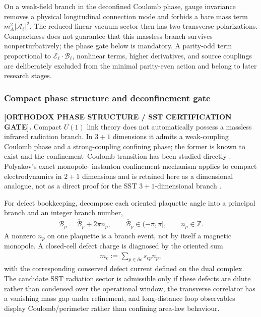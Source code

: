On a weak-field branch in the deconfined Coulomb phase, gauge invariance removes
a physical longitudinal connection mode and forbids a bare mass term
$m_A^2|\boldsymbol{\mathcal A}_\ell|^2$.  The reduced linear vacuum sector then
has two transverse polarizations.  Compactness does not guarantee that this
massless branch survives nonperturbatively; the phase gate below is mandatory.
A parity-odd term proportional
to $\boldsymbol{\mathcal E}_\ell\cdot\boldsymbol{\mathcal B}_\ell$, nonlinear
terms, higher derivatives, and source couplings are deliberately excluded from
the minimal parity-even action and belong to later research stages.

\subsubsection{Compact phase structure and deconfinement gate}
\label{subsubsec:rt_compact_u1_deconfinement_gate}

\textbf{[ORTHODOX PHASE STRUCTURE / SST CERTIFICATION GATE].}
Compact \(U(1)\) link theory does not automatically possess a massless infrared
radiation branch.  In \(3{+}1\) dimensions it admits a weak-coupling Coulomb
phase and a strong-coupling confining phase; the former is known to exist and
the confinement--Coulomb transition has been studied directly
\cite{Guth1980,JersakLangNeuhaus1996,Kogut1979}.  Polyakov's exact monopole-
instanton confinement mechanism applies to compact electrodynamics in
\(2{+}1\) dimensions and is retained here as a dimensional analogue, not as a
direct proof for the SST \(3{+}1\)-dimensional branch \cite{Polyakov1977}.

For defect bookkeeping, decompose each oriented plaquette angle into a principal
branch and an integer branch number,
\begin{align}
    \mathscr B_p
    =
    \overline{\mathscr B}_p+2\pi n_p,
    \qquad
    \overline{\mathscr B}_p\in(-\pi,\pi],
    \qquad
    n_p\in\mathbb Z.
    \label{eq:rt_compact_plaquette_branch_decomposition}
\end{align}
A nonzero \(n_p\) on one plaquette is a branch event, not by itself a magnetic
monopole.  A closed-cell defect charge is diagnosed by the oriented sum
\begin{align}
    m_c
    :=
    \sum_{p\in\partial c}s_{cp}n_p,
    \label{eq:rt_compact_closed_cell_defect_charge}
\end{align}
with the corresponding conserved defect current defined on the dual complex.
The candidate SST radiation sector is admissible only if these defects are
dilute rather than condensed over the operational window, the transverse
correlator has a vanishing mass gap under refinement, and long-distance loop
observables display Coulomb/perimeter rather than confining area-law behaviour.

